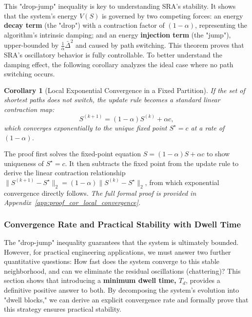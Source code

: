 \documentclass[journal]{IEEEtran}
\newtheorem{corollary}{Corollary}
\begin{document}
This "drop-jump" inequality is key to understanding SRA's stability. It shows that the system's energy $V(S)$ is governed by two competing forces: an energy \textbf{decay term} (the "drop") with a contraction factor of $(1-\alpha)$, representing the algorithm's intrinsic damping; and an energy \textbf{injection term} (the "jump"), upper-bounded by $\frac{1}{\alpha}\bar\Delta^2$ and caused by path switching. This theorem proves that SRA's oscillatory behavior is fully controllable. To better understand the damping effect, the following corollary analyzes the ideal case where no path switching occurs.

\begin{corollary}[Local Exponential Convergence in a Fixed Partition]
\label{cor:local_convergence}
If the set of shortest paths does not switch, the update rule becomes a standard linear contraction map:
\begin{equation}\label{eq:linear_update}
S^{(k+1)}=(1-\alpha)S^{(k)}+\alpha c,
\end{equation}
which converges exponentially to the unique fixed point $S^\star=c$ at a rate of $(1-\alpha)$.
\end{corollary}
\begin{IEEEproof}
The proof first solves the fixed-point equation $S=(1-\alpha)S+\alpha c$ to show uniqueness of $S^\star=c$. It then subtracts the fixed point from the update rule to derive the linear contraction relationship $\|S^{(k+1)}-S^\star\|_2 = (1-\alpha)\|S^{(k)}-S^\star\|_2$, from which exponential convergence directly follows. \textit{The full formal proof is provided in Appendix~\ref{app:proof_cor_local_convergence}.}
\end{IEEEproof}

\subsubsection{Convergence Rate and Practical Stability with Dwell Time}
\label{subsec:practical_stability_rate}

The "drop-jump" inequality guarantees that the system is ultimately bounded. However, for practical engineering applications, we must answer two further quantitative questions: How fast does the system converge to this stable neighborhood, and can we eliminate the residual oscillations (chattering)? This section shows that introducing a \textbf{minimum dwell time, $T_d$}, provides a definitive positive answer to both. By decomposing the system's evolution into "dwell blocks," we can derive an explicit convergence rate and formally prove that this strategy ensures practical stability.
\end{document}
